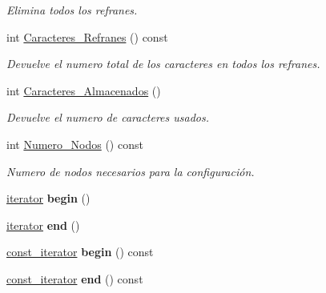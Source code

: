 \begin{DoxyCompactItemize}
\begin{DoxyCompactList}\small\item\em Elimina todos los refranes. \end{DoxyCompactList}\item 
int \hyperlink{class_refranes_a613535ba73502e5138a05fe38df7890d}{Caracteres\+\_\+\+Refranes} () const \hypertarget{class_refranes_a613535ba73502e5138a05fe38df7890d}{}\label{class_refranes_a613535ba73502e5138a05fe38df7890d}

\begin{DoxyCompactList}\small\item\em Devuelve el numero total de los caracteres en todos los refranes. \end{DoxyCompactList}\item 
int \hyperlink{class_refranes_a2b5be076bac4c2f92dec6c203b7a5dc1}{Caracteres\+\_\+\+Almacenados} ()
\begin{DoxyCompactList}\small\item\em Devuelve el numero de caracteres usados. \end{DoxyCompactList}\item 
int \hyperlink{class_refranes_ac614fa34e80650ea4291a73dd92c718e}{Numero\+\_\+\+Nodos} () const \hypertarget{class_refranes_ac614fa34e80650ea4291a73dd92c718e}{}\label{class_refranes_ac614fa34e80650ea4291a73dd92c718e}

\begin{DoxyCompactList}\small\item\em Numero de nodos necesarios para la configuración. \end{DoxyCompactList}\item 
\hyperlink{class_refranes_1_1iterator}{iterator} {\bfseries begin} ()\hypertarget{class_refranes_ad0d55129b8b167b43a940f10ef7db0af}{}\label{class_refranes_ad0d55129b8b167b43a940f10ef7db0af}

\item 
\hyperlink{class_refranes_1_1iterator}{iterator} {\bfseries end} ()\hypertarget{class_refranes_a561c424d749f21c41d4e597ecf92baba}{}\label{class_refranes_a561c424d749f21c41d4e597ecf92baba}

\item 
\hyperlink{class_refranes_1_1const__iterator}{const\+\_\+iterator} {\bfseries begin} () const \hypertarget{class_refranes_ab38e8756142244adec1d211f904e4d7f}{}\label{class_refranes_ab38e8756142244adec1d211f904e4d7f}

\item 
\hyperlink{class_refranes_1_1const__iterator}{const\+\_\+iterator} {\bfseries end} () const \hypertarget{class_refranes_a6057abc3246589f8604bc11ade22b4b3}{}\label{class_refranes_a6057abc3246589f8604bc11ade22b4b3}


\end{DoxyCompactItemize}
